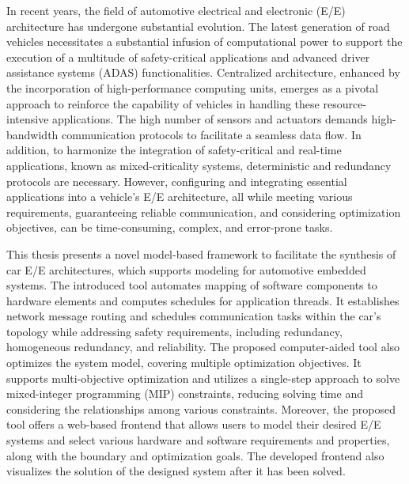     In recent years, the field of automotive electrical and electronic (E/E) architecture has undergone substantial evolution. The latest generation of road vehicles necessitates a substantial infusion of computational power to support the execution of a multitude of safety-critical applications and advanced driver assistance systems (ADAS) functionalities. Centralized architecture, enhanced by the incorporation of high-performance computing units, emerges as a pivotal approach to reinforce the capability of vehicles in handling these resource-intensive applications. The high number of sensors and actuators demands high-bandwidth communication protocols to facilitate a seamless data flow. In addition, to harmonize the integration of safety-critical and real-time applications, known as mixed-criticality systems, deterministic and redundancy protocols are necessary.
    However, configuring and integrating essential applications into a vehicle's E/E architecture, all while meeting various requirements, guaranteeing reliable communication, and considering optimization objectives, can be time-consuming, complex, and error-prone tasks. 
    
    
    
    
    This thesis presents a novel model-based framework to facilitate the synthesis of car E/E architectures, which supports modeling for automotive embedded systems. The introduced tool automates mapping of software components to hardware elements and computes schedules for application threads. It establishes network message routing and schedules communication tasks within the car's topology while addressing safety requirements, including redundancy, homogeneous redundancy, and reliability.
    The proposed computer-aided tool also optimizes the system model, covering multiple optimization objectives. It supports multi-objective optimization and utilizes a single-step approach to solve mixed-integer programming (MIP) constraints, reducing solving time and considering the relationships among various constraints. Moreover, the proposed tool offers a web-based frontend that allows users to model their desired E/E systems and select various hardware and software requirements and properties, along with the boundary and optimization goals. The developed frontend also visualizes the solution of the designed system after it has been solved.
    
